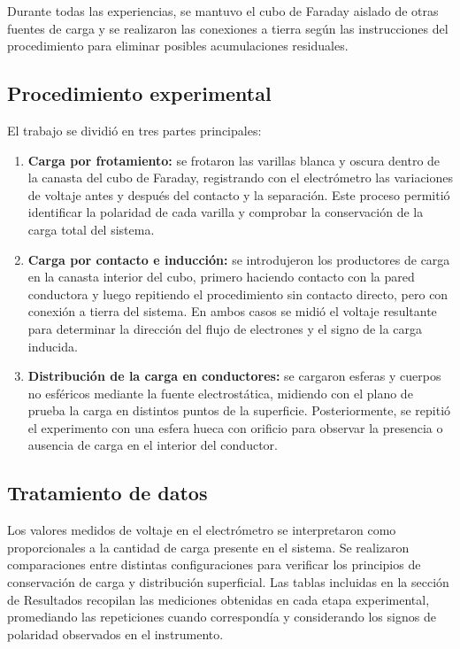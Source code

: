 \documentclass[12pt,a4paper]{article}
\begin{document}
Durante todas las experiencias, se mantuvo el cubo de Faraday aislado de otras fuentes de carga y se realizaron las conexiones a tierra según las instrucciones del procedimiento para eliminar posibles acumulaciones residuales.

\subsection{Procedimiento experimental}
El trabajo se dividió en tres partes principales:

\begin{enumerate}
    \item \textbf{Carga por frotamiento:} se frotaron las varillas blanca y oscura dentro de la canasta del cubo de Faraday, registrando con el electrómetro las variaciones de voltaje antes y después del contacto y la separación. Este proceso permitió identificar la polaridad de cada varilla y comprobar la conservación de la carga total del sistema.

    \item \textbf{Carga por contacto e inducción:} se introdujeron los productores de carga en la canasta interior del cubo, primero haciendo contacto con la pared conductora y luego repitiendo el procedimiento sin contacto directo, pero con conexión a tierra del sistema. En ambos casos se midió el voltaje resultante para determinar la dirección del flujo de electrones y el signo de la carga inducida.

    \item \textbf{Distribución de la carga en conductores:} se cargaron esferas y cuerpos no esféricos mediante la fuente electrostática, midiendo con el plano de prueba la carga en distintos puntos de la superficie. Posteriormente, se repitió el experimento con una esfera hueca con orificio para observar la presencia o ausencia de carga en el interior del conductor.
\end{enumerate}

\subsection{Tratamiento de datos}
Los valores medidos de voltaje en el electrómetro se interpretaron como proporcionales a la cantidad de carga presente en el sistema. Se realizaron comparaciones entre distintas configuraciones para verificar los principios de conservación de carga y distribución superficial. Las tablas incluidas en la sección de Resultados recopilan las mediciones obtenidas en cada etapa experimental, promediando las repeticiones cuando correspondía y considerando los signos de polaridad observados en el instrumento.
\end{document}
